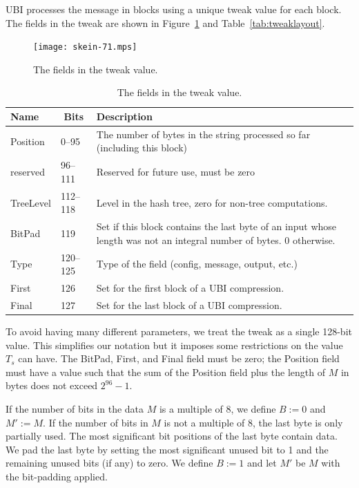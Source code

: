 \documentclass[11pt,twoside]{article}
\def\symdef#1{\label{symdef:#1}}
\begin{document}
UBI processes the message in blocks using a unique tweak value for each block. The fields in the tweak are shown in Figure~\ref{fig:tweaklayout} and Table~\ref{tab:tweaklayout}.
%
\begin{figure}[tbph]
\begin{center}
\texttt{[image: skein-71.mps]}
\end{center}
\caption{The fields in the tweak value.}\label{fig:tweaklayout}
\end{figure}
%
%
\begin{table}[tbph]
  \begin{center}
    \begin{tabular}{|llp{250pt}|}
    \hline
    Name & \multicolumn{1}{c}{Bits} & Description \\
    \hline
    Position & \phantom{00}0--\phantom{0}95 & The number of bytes in the string processed so far (including this block)\\
    reserved &\phantom{0}96--111 & Reserved for future use, must be zero \\
    TreeLevel & 112--118 & Level in the hash tree, zero for non-tree computations.\\
    BitPad & 119 & Set if this block contains the last byte of an input whose length was not an
    integral number of bytes. 0 otherwise. \\
    Type & 120--125 & Type of the field (config, message, output, etc.)\\
    First & 126 & Set for the first block of a UBI compression.\\
    Final & 127 & Set for the last block of a UBI compression.\\
    \hline
    \end{tabular}
    \caption{The fields in the tweak value.}\label{tab:tweaklayout}\symdef{T}
  \end{center}
\end{table}
%
To avoid having many different parameters, we treat the tweak as a single 128-bit value. This simplifies our notation but it imposes some restrictions on the value $T_s$ can have. The BitPad, First, and Final field must be zero; the Position field must have a value such that the sum of the Position field plus the length of $M$ in bytes does not exceed $2^{96}-1$.


If the number of bits in the data $M$ is a multiple of 8, we define $B:=0$ and $M' := M$. If the number of bits in $M$ is not a multiple of 8, the last byte is only partially used. The most significant bit positions of the last byte contain data. We pad the last byte by setting the most significant unused bit to 1 and the remaining unused bits (if any) to zero. We define $B:=1$ and let $M'$ be $M$ with the bit-padding applied.
\end{document}
